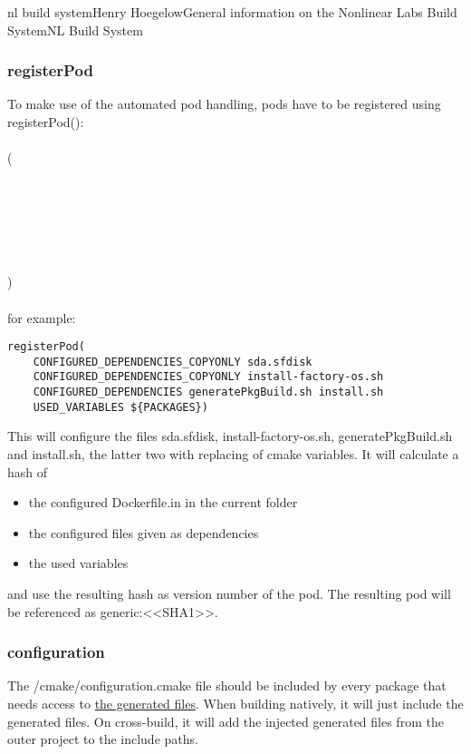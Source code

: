 \documentclass[11pt]{article}
\begin{document}
\begin{Name}{1}{nl build system}{Henry Hoegelow}{General information on the Nonlinear Labs Build System}{NL Build System}
\subsubsection{registerPod}
To make use of the automated pod handling, pods have to be registered using registerPod():\\
\\
(\\
\indent{}\\
\indent{}\\
\indent{}\\
\indent{}\\
\indent{}\\
\indent{}\\
\indent{})\\
\\
for example:
\begin{verbatim}
registerPod(
	CONFIGURED_DEPENDENCIES_COPYONLY sda.sfdisk 
	CONFIGURED_DEPENDENCIES_COPYONLY install-factory-os.sh
	CONFIGURED_DEPENDENCIES generatePkgBuild.sh install.sh
	USED_VARIABLES ${PACKAGES})
\end{verbatim}
This will configure the files sda.sfdisk, install-factory-os.sh, generatePkgBuild.sh and install.sh, the latter two with replacing of cmake variables. It will calculate a hash of
\begin{itemize}
\item the configured Dockerfile.in in the current folder
\item the configured files given as dependencies
\item the used variables
\end{itemize}
and use the resulting hash as version number of the pod. The resulting pod will be referenced as generic:<<SHA1>>.

\subsubsection{configuration}
The /cmake/configuration.cmake file should be included by every package that needs access to \hyperref[whygenerated]{the generated files}. When building natively, it will just include the generated files. On cross-build, it will add the injected generated files from the outer project to the include paths.


\end{Name}
\end{document}
